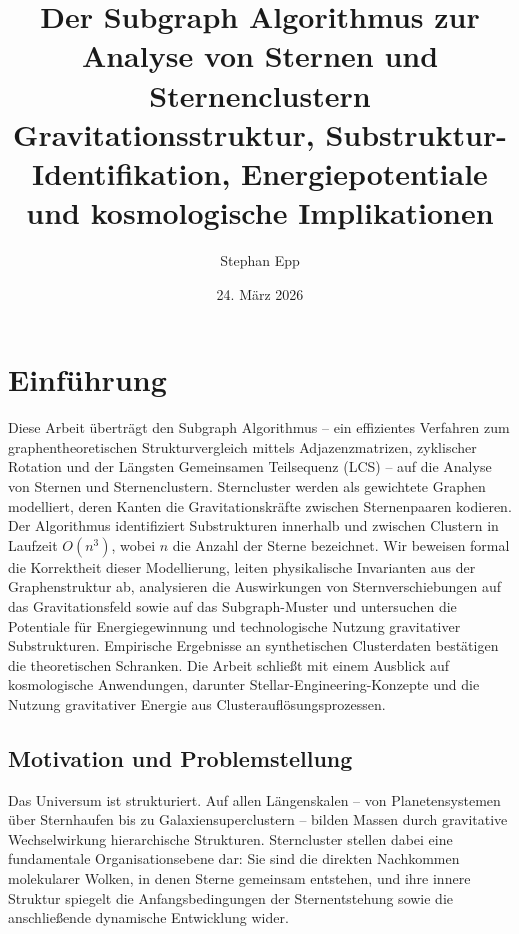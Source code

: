 ﻿\documentclass[a4paper,12pt]{report}
\title{\textbf{Der Subgraph Algorithmus zur Analyse von Sternen und Sternenclustern}\\
\large Gravitationsstruktur, Substruktur-Identifikation, Energiepotentiale\\
und kosmologische Implikationen}
\author{Stephan Epp}
\date{24. März 2026}
\theoremstyle{definition}
\begin{document}
\maketitle

\tableofcontents
\newpage

\chapter{Einführung}
Diese Arbeit überträgt den Subgraph Algorithmus -- ein effizientes Verfahren zum graphentheoretischen Strukturvergleich mittels Adjazenzmatrizen, zyklischer Rotation und der Längsten Gemeinsamen Teilsequenz (LCS) -- auf die Analyse von Sternen und Sternenclustern. Sterncluster werden als gewichtete Graphen modelliert, deren Kanten die Gravitationskräfte zwischen Sternenpaaren kodieren. Der Algorithmus identifiziert Substrukturen innerhalb und zwischen Clustern in Laufzeit $O(n^3)$, wobei $n$ die Anzahl der Sterne bezeichnet. Wir beweisen formal die Korrektheit dieser Modellierung, leiten physikalische Invarianten aus der Graphenstruktur ab, analysieren die Auswirkungen von Sternverschiebungen auf das Gravitationsfeld sowie auf das Subgraph-Muster und untersuchen die Potentiale für Energiegewinnung und technologische Nutzung gravitativer Substrukturen. Empirische Ergebnisse an synthetischen Clusterdaten bestätigen die theoretischen Schranken. Die Arbeit schließt mit einem Ausblick auf kosmologische Anwendungen, darunter Stellar-Engineering-Konzepte und die Nutzung gravitativer Energie aus Clusterauflösungsprozessen.

\section{Motivation und Problemstellung}

Das Universum ist strukturiert. Auf allen Längenskalen -- von Planetensystemen über Sternhaufen bis zu Galaxiensuperclustern -- bilden Massen durch gravitative Wechselwirkung hierarchische Strukturen. Sterncluster stellen dabei eine fundamentale Organisationsebene dar: Sie sind die direkten Nachkommen molekularer Wolken, in denen Sterne gemeinsam entstehen, und ihre innere Struktur spiegelt die Anfangsbedingungen der Sternentstehung sowie die anschließende dynamische Entwicklung wider.
\end{document}
